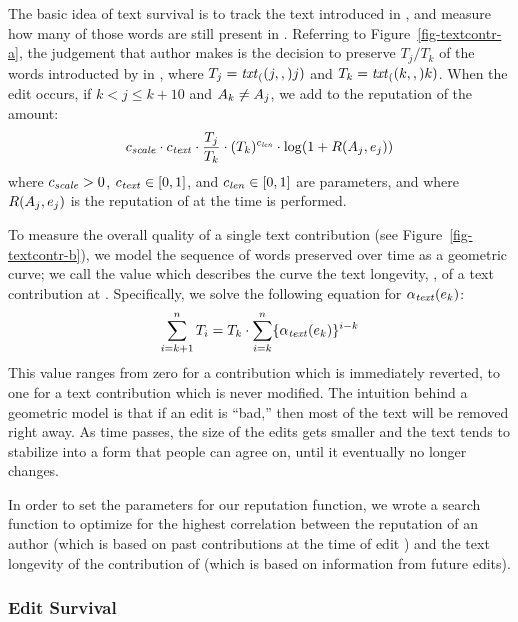   The basic idea of text survival is to track the text introduced in
  , and measure how many of those words are
  still present in .
  Referring to Figure~\ref{fig-textcontr-a}, the judgement
  that author  makes is the
  decision to preserve $T_j / T_k$ of the words introducted
  by  in , where
  $T_j = \mathit{txt}_{(}(j,,)j)$ and $T_k = \mathit{txt}_{(}(k,,)k)$.
  When the edit  occurs, if
  $k < j \leq k+10$ and $A_{k} \neq A_{j}$,
  we add to the reputation
  of  the amount:
  \[
    {c_{{\text{\textit{scale}}}}} \cdot {c_{{\text{\textit{text}}}}} \cdot \frac{T_j}{T_k}
    \cdot (T_k)^{c_{{\text{\textit{len}}}}} \cdot \log(1 + R(A_{j},e_{j}))
  \]
  where ${c_{{\text{\textit{scale}}}}} > 0$, ${c_{{\text{\textit{text}}}}} \in [0,1]$, and ${c_{{\text{\textit{len}}}}} \in
  [0,1]$ are parameters, and where $R(A_{j},e_{j})$
  is the reputation of  at the time  is performed.

  To measure the overall quality of a single text contribution
  (see Figure~\ref{fig-textcontr-b}), we model the sequence of
  words preserved over time as a geometric curve; we call the
  value which describes the curve
  the text longevity, \tlong, of a text contribution at .
  Specifically, we solve the following equation for $\alpha_\text{\textit{text}}(e_{k})$:
  \begin{equation*}
  	\sum_{i=k+1}^n T_i = T_k \cdot
		\sum_{i=k}^n \{ \alpha_\text{\textit{text}}(e_{k}) \}^{i-k}
  \end{equation*}
  This value ranges from zero for a contribution which is immediately
  reverted, to one for a text contribution which is never modified.
  The intuition behind a geometric model is that if an edit is
  ``bad,'' then most of the text will be removed right away.
  As time passes, the size of the edits gets smaller and
  the text tends to stabilize into a form
  that people can agree on, until it eventually no longer changes.

  In order to set the parameters for our reputation function,
  we wrote a search function to optimize for the highest
  correlation between the reputation of an author (which is
  based on past contributions at the time of edit )
  and the text longevity of the contribution of 
  (which is based on information from future edits).

\subsubsection*{Edit Survival}


